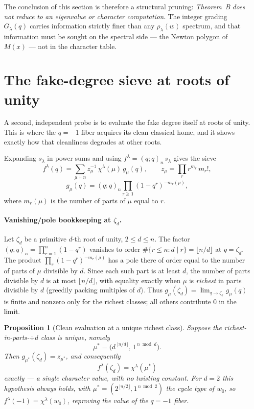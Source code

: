 \documentclass{article}
\newtheorem{proposition}{Proposition}
\theoremstyle{definition}
\theoremstyle{remark}
\begin{document}
The conclusion of this section is therefore a structural pruning: \emph{Theorem~B
does not reduce to an eigenvalue or character computation.} The integer grading
$G_\lambda(q)$ carries information strictly finer than any $\rho_\lambda(w)$
spectrum, and that information must be sought on the spectral side --- the Newton
polygon of $M(x)$ --- not in the character table.

\section{The fake-degree sieve at roots of unity}

A second, independent probe is to evaluate the fake degree itself at roots of
unity. This is where the $q=-1$ fiber acquires its clean classical home, and it
shows exactly how that cleanliness degrades at other roots.

Expanding $s_\lambda$ in power sums and using $f^\lambda = (q;q)_n\, s_\lambda$
gives the sieve
\[
f^\lambda(q) = \sum_{\mu \vdash n} z_\mu^{-1}\, \chi^\lambda(\mu)\, g_\mu(q),
\qquad
z_\mu = \prod_r r^{m_r}\, m_r!,
\]
\[
g_\mu(q) = (q;q)_n \prod_{r \ge 1} (1 - q^r)^{-m_r(\mu)},
\]
where $m_r(\mu)$ is the number of parts of $\mu$ equal to $r$.

\paragraph{Vanishing/pole bookkeeping at $\zeta_d$.}
Let $\zeta_d$ be a primitive $d$-th root of unity, $2 \le d \le n$. The factor
$(q;q)_n = \prod_{r=1}^n(1-q^r)$ vanishes to order $\#\{r \le n : d \mid r\}
= \lfloor n/d \rfloor$ at $q = \zeta_d$. The product
$\prod_r (1-q^r)^{-m_r(\mu)}$ has a pole there of order equal to the number of
parts of $\mu$ divisible by $d$. Since each such part is at least $d$, the number
of parts divisible by $d$ is at most $\lfloor n/d \rfloor$, with equality exactly
when $\mu$ is \emph{richest} in parts divisible by $d$ (greedily packing
multiples of $d$). Thus $g_\mu(\zeta_d) = \lim_{q \to \zeta_d} g_\mu(q)$ is finite
and nonzero only for the richest classes; all others contribute $0$ in the limit.

\begin{proposition}[Clean evaluation at a unique richest class]\label{prop:clean}
Suppose the richest-in-parts-$\div d$ class is unique, namely
\[
\mu^* = \bigl(d^{\,\lfloor n/d\rfloor},\, 1^{\,n \bmod d}\bigr).
\]
Then $g_{\mu^*}(\zeta_d) = z_{\mu^*}$, and consequently
\[
f^\lambda(\zeta_d) = \chi^\lambda(\mu^*)
\]
exactly --- a single character value, with no twisting constant. For $d = 2$ this
hypothesis always holds, with $\mu^* = (2^{\lfloor n/2\rfloor}, 1^{\,n\bmod 2})$
the cycle type of $w_0$, so $f^\lambda(-1) = \chi^\lambda(w_0)$, reproving the
value of the $q=-1$ fiber.
\end{proposition}
\end{document}
